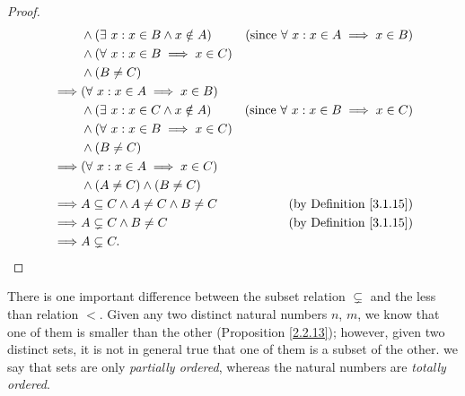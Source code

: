 \begin{proof}
\begin{align*}
                 & \land (\exists\ x : x \in B \land x \notin A)                                   & \text{(since \(\forall\ x : x \in A \implies x \in B\))} \\
                 & \land (\forall\ x : x \in B \implies x \in C)                                                                                              \\
                 & \land (B \neq C)                                                                                                                           \\
        \implies & (\forall\ x : x \in A \implies x \in B)                                                                                                    \\
                 & \land (\exists\ x : x \in C \land x \notin A)                                   & \text{(since \(\forall\ x : x \in B \implies x \in C\))} \\
                 & \land (\forall\ x : x \in B \implies x \in C)                                                                                              \\
                 & \land (B \neq C)                                                                                                                           \\
        \implies & (\forall\ x : x \in A \implies x \in C)                                                                                                    \\
                 & \land (A \neq C) \land (B \neq C)                                                                                                          \\
        \implies & A \subseteq C \land A \neq C \land B \neq C                                     & \text{(by Definition \ref{3.1.15})}                      \\
        \implies & A \subsetneq C \land B \neq C                                                   & \text{(by Definition \ref{3.1.15})}                      \\
        \implies & A \subsetneq C.
    \end{align*}
\end{proof}

\setcounter{theorem}{19}
\begin{remark}\label{3.1.20}
    There is one important difference between the subset relation \(\subsetneq\) and the less than relation \(<\).
    Given any two distinct natural numbers \(n\), \(m\), we know that one of them is smaller than the other (Proposition \ref{2.2.13});
    however, given two distinct sets, it is not in general true that one of them is a subset of the other.
    we say that sets are only \emph{partially ordered}, whereas the natural numbers are \emph{totally ordered}.
\end{remark}

